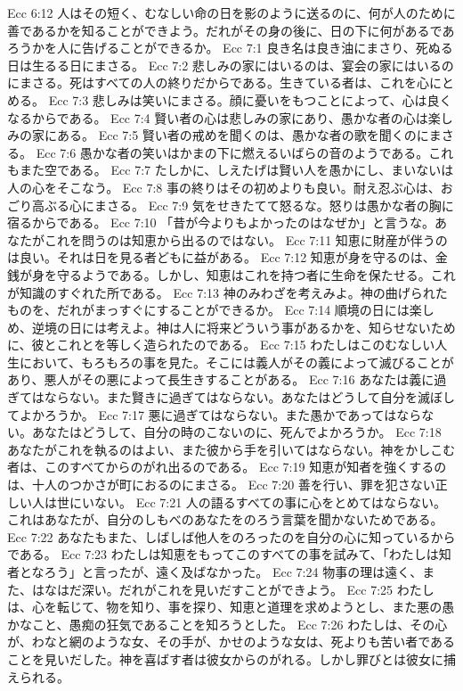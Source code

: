 Ecc 6:12  人はその短く、むなしい命の日を影のように送るのに、何が人のために善であるかを知ることができよう。だれがその身の後に、日の下に何があるであろうかを人に告げることができるか。
Ecc 7:1  良き名は良き油にまさり、死ぬる日は生るる日にまさる。
Ecc 7:2  悲しみの家にはいるのは、宴会の家にはいるのにまさる。死はすべての人の終りだからである。生きている者は、これを心にとめる。
Ecc 7:3  悲しみは笑いにまさる。顔に憂いをもつことによって、心は良くなるからである。
Ecc 7:4  賢い者の心は悲しみの家にあり、愚かな者の心は楽しみの家にある。
Ecc 7:5  賢い者の戒めを聞くのは、愚かな者の歌を聞くのにまさる。
Ecc 7:6  愚かな者の笑いはかまの下に燃えるいばらの音のようである。これもまた空である。
Ecc 7:7  たしかに、しえたげは賢い人を愚かにし、まいないは人の心をそこなう。
Ecc 7:8  事の終りはその初めよりも良い。耐え忍ぶ心は、おごり高ぶる心にまさる。
Ecc 7:9  気をせきたてて怒るな。怒りは愚かな者の胸に宿るからである。
Ecc 7:10  「昔が今よりもよかったのはなぜか」と言うな。あなたがこれを問うのは知恵から出るのではない。
Ecc 7:11  知恵に財産が伴うのは良い。それは日を見る者どもに益がある。
Ecc 7:12  知恵が身を守るのは、金銭が身を守るようである。しかし、知恵はこれを持つ者に生命を保たせる。これが知識のすぐれた所である。
Ecc 7:13  神のみわざを考えみよ。神の曲げられたものを、だれがまっすぐにすることができるか。
Ecc 7:14  順境の日には楽しめ、逆境の日には考えよ。神は人に将来どういう事があるかを、知らせないために、彼とこれとを等しく造られたのである。
Ecc 7:15  わたしはこのむなしい人生において、もろもろの事を見た。そこには義人がその義によって滅びることがあり、悪人がその悪によって長生きすることがある。
Ecc 7:16  あなたは義に過ぎてはならない。また賢きに過ぎてはならない。あなたはどうして自分を滅ぼしてよかろうか。
Ecc 7:17  悪に過ぎてはならない。また愚かであってはならない。あなたはどうして、自分の時のこないのに、死んでよかろうか。
Ecc 7:18  あなたがこれを執るのはよい、また彼から手を引いてはならない。神をかしこむ者は、このすべてからのがれ出るのである。
Ecc 7:19  知恵が知者を強くするのは、十人のつかさが町におるのにまさる。
Ecc 7:20  善を行い、罪を犯さない正しい人は世にいない。
Ecc 7:21  人の語るすべての事に心をとめてはならない。これはあなたが、自分のしもべのあなたをのろう言葉を聞かないためである。
Ecc 7:22  あなたもまた、しばしば他人をのろったのを自分の心に知っているからである。
Ecc 7:23  わたしは知恵をもってこのすべての事を試みて、「わたしは知者となろう」と言ったが、遠く及ばなかった。
Ecc 7:24  物事の理は遠く、また、はなはだ深い。だれがこれを見いだすことができよう。
Ecc 7:25  わたしは、心を転じて、物を知り、事を探り、知恵と道理を求めようとし、また悪の愚かなこと、愚痴の狂気であることを知ろうとした。
Ecc 7:26  わたしは、その心が、わなと網のような女、その手が、かせのような女は、死よりも苦い者であることを見いだした。神を喜ばす者は彼女からのがれる。しかし罪びとは彼女に捕えられる。
